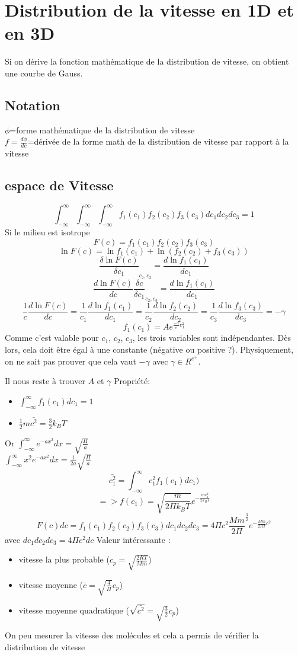 \documentclass{report}
\begin{document}
\section{Distribution de la vitesse en 1D et en 3D}
Si on dérive la fonction mathématique de la distribution de vitesse, on obtient une courbe de Gauss.
\subsection{Notation}
$\phi$=forme mathématique de la distribution de vitesse\\
$f=\frac{d\phi}{dc}$=dérivée de la forme math de la distribution de vitesse par rapport à la vitesse
\subsection{espace de Vitesse}
$$\int_{-\infty}^{\infty}{\int_{-\infty}^{\infty}{\int_{-\infty}^{\infty}{f_1(c_1)f_2(c_2)f_3(c_3)dc_1dc_2dc_3}}}=1$$
Si le milieu est isotrope
$$F(c)=f_1(c_1)f_2(c_2)f_3(c_3)$$
$$\ln{F(c)}=\ln{f_1(c_1)}+\ln{(f_2(c_2)+f_3(c_3))}$$
$$\frac{\delta\ln{F(c)}}{\delta c_1}_{c_2,c_3}=\frac{d\ln{f_1(c_1)}}{dc_1}$$
$$\frac{d \ln{F(c)}}{dc}\frac{\delta c}{\delta c_1}_{c_2,c_3}=\frac{d\ln{f_1(c_1)}}{dc_1}$$
$$\frac{1}{c} \frac{d\ln{F(c)}}{dc}=\frac{1}{c_1}\frac{d\ln{f_1(c_1)}}{dc_1}=\frac{1}{c_2}\frac{d\ln{f_2(c_2)}}{dc_2}=\frac{1}{c_3}\frac{d\ln{f_3(c_3)}}{dc_3}=-\gamma$$
$$f_1(c_1)=Ae^{\frac{-\gamma}{e}c_1^2}$$
Comme c'est valable pour $c_1$, $c_2$, $c_3$, les trois variables sont indépendantes. Dès lors, cela doit être égal à une constante (négative ou positive ?). Physiquement, on ne sait pas prouver que cela vaut $-\gamma$ avec $\gamma \in R^{e^{+}}$.

Il nous reste à trouver $A$ et $\gamma$
Propriété:
\begin{itemize}
\item $\int_{-\infty}^{\infty}{f_1(c_1) dc_1}=1$
\item $\frac{1}{2} m\bar{c^2}=\frac{3}{2}k_BT$
\end{itemize}
Or $\int_{-\infty}^{\infty}{e^{-ax^2}dx}=\sqrt{\frac{\Pi}{a}}$\\
$\int_{-\infty}^{\infty}{x^2e^{-ax^2}dx}=\frac{1}{2a}\sqrt{\frac{\Pi}{a}}$
$$\bar{c_1^2}=\int_{-\infty}^{\infty}{c_1^2f_1(c_1)dc_1)}$$
$$=>f(c_1)=\sqrt{\frac{m}{2\Pi k_B T}}e^{-\frac{mc_1^2}{2k_BT}}$$
$$F(c)dc=f_1(c_1)f_2(c_2)f_3(c_3)dc_1dc_2dc_3 = 4\Pi c^2\frac{Mm}{2\Pi}^{\frac{3}{2}}e^{-\frac{Mm}{2RT}c^2}$$
avec $dc_1dc_2dc_3=4\Pi c^2 dc$
Valeur intéressante :
\begin{itemize}
\item vitesse la plus probable ($c_p=\sqrt{\frac{2RT}{Mm}}$)
\item vitesse moyenne ($\bar{c}=\sqrt{\frac{4}{\Pi}}c_p$)
\item vitesse moyenne quadratique ($\sqrt{\bar{c^2}}=\sqrt{\frac{3}{2}}c_p$)
\end{itemize}
On peu mesurer la vitesse des molécules et cela a permis de vérifier la distribution de vitesse
\end{document}
